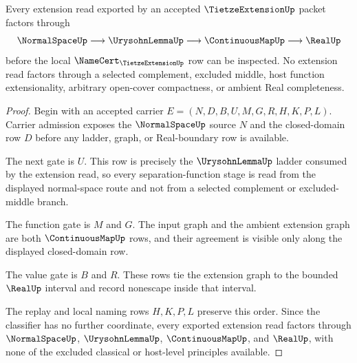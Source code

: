 \begin{theorem}
\label{thm:tietze-extension-urysohn-route}
Every extension read exported by an accepted $\TietzeExtensionUp$ packet factors through
$$
\NormalSpaceUp \longrightarrow \UrysohnLemmaUp \longrightarrow \ContinuousMapUp \longrightarrow \RealUp
$$
before the local $\NameCert_{\TietzeExtensionUp}$ row can be inspected. No extension read factors through a selected complement, excluded middle, host function extensionality, arbitrary open-cover compactness, or ambient Real completeness.
\end{theorem}
\begin{proof}
Begin with an accepted carrier $E=(N,D,B,U,M,G,R,H,K,P,L)$. Carrier admission exposes the $\NormalSpaceUp$ source $N$ and the closed-domain row $D$ before any ladder, graph, or Real-boundary row is available.

The next gate is $U$. This row is precisely the $\UrysohnLemmaUp$ ladder consumed by the extension read, so every separation-function stage is read from the displayed normal-space route and not from a selected complement or excluded-middle branch.

The function gate is $M$ and $G$. The input graph and the ambient extension graph are both $\ContinuousMapUp$ rows, and their agreement is visible only along the displayed closed-domain row.

The value gate is $B$ and $R$. These rows tie the extension graph to the bounded $\RealUp$ interval and record nonescape inside that interval.

The replay and local naming rows $H,K,P,L$ preserve this order. Since the classifier has no further coordinate, every exported extension read factors through $\NormalSpaceUp$, $\UrysohnLemmaUp$, $\ContinuousMapUp$, and $\RealUp$, with none of the excluded classical or host-level principles available.
\end{proof}


